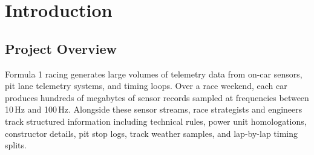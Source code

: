 \documentclass[12pt,a4paper]{report}
\begin{document}
\begin{abstract}
Formula 1 teams record hundreds of gigabytes of telemetry per car across each race weekend, covering power unit telemetry, tyre degradation, track conditions, and pit stop strategies. Storing this information in unnormalized flat files or loosely structured formats makes it difficult to maintain data integrity, query historical trends, and correlate technical rules with race performance.

In this project, we develop \textbf{F1 Apex}, a relational database management system (RDBMS) paired with an analytical race simulation engine. The database is implemented in PostgreSQL using a 14-table schema normalized to Third Normal Form (3NF). It models teams, drivers, circuits, telemetry channels, tyre compounds, and race results, incorporating the 2026 FIA technical regulations such as active aerodynamics and updated power unit specifications. The backend is connected to an interactive Next.js and TypeScript web interface with telemetry plotting tools and a Monte Carlo race simulation engine. We evaluate the system using historical timing data and a detailed case study of the 2026 United States Grand Prix at the Circuit of the Americas (COTA), validating how relational schema design and session data updates improve outcome predictions.
\end{abstract}

\newpage
\tableofcontents
\newpage
\listoffigures
\listoftables

\newpage
{}
\setcounter{page}{1}

\chapter{Introduction}

\section{Project Overview}
Formula 1 racing generates large volumes of telemetry data from on-car sensors, pit lane telemetry systems, and timing loops. Over a race weekend, each car produces hundreds of megabytes of sensor records sampled at frequencies between 10\,Hz and 100\,Hz. Alongside these sensor streams, race strategists and engineers track structured information including technical rules, power unit homologations, constructor details, pit stop logs, track weather samples, and lap-by-lap timing splits.
\end{document}
